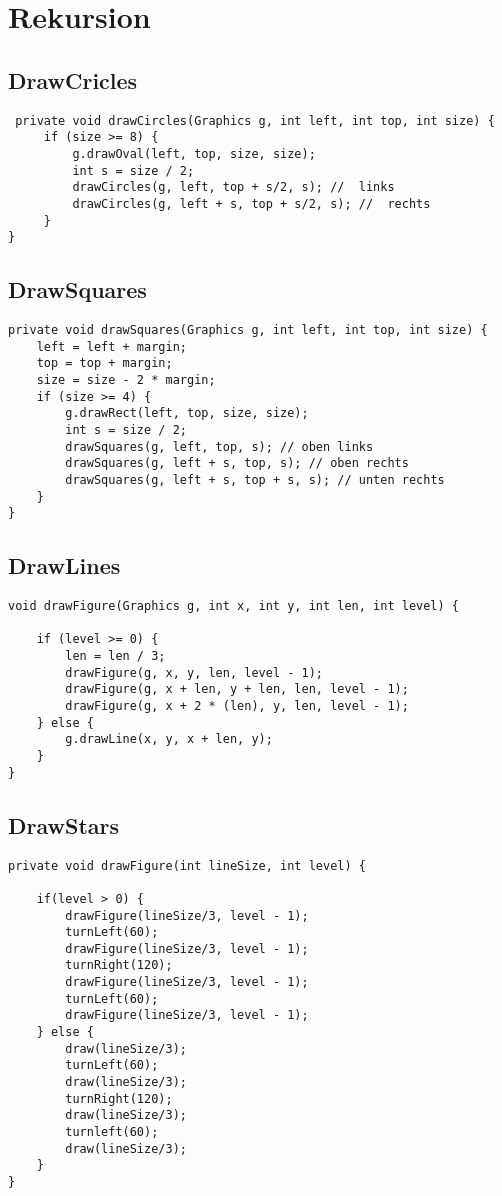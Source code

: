 \section*{Rekursion}
\subsection*{DrawCricles}
\begin{verbatim}
 private void drawCircles(Graphics g, int left, int top, int size) {
     if (size >= 8) {
         g.drawOval(left, top, size, size);
         int s = size / 2;
         drawCircles(g, left, top + s/2, s); //  links
         drawCircles(g, left + s, top + s/2, s); //  rechts
     }
}
\end{verbatim}

\subsection*{DrawSquares}

\begin{verbatim}
private void drawSquares(Graphics g, int left, int top, int size) {
    left = left + margin;
    top = top + margin;
    size = size - 2 * margin;
    if (size >= 4) {
        g.drawRect(left, top, size, size);
        int s = size / 2;
        drawSquares(g, left, top, s); // oben links
        drawSquares(g, left + s, top, s); // oben rechts
        drawSquares(g, left + s, top + s, s); // unten rechts
    }
}
\end{verbatim}

\subsection*{DrawLines}
\begin{verbatim}    
void drawFigure(Graphics g, int x, int y, int len, int level) {

    if (level >= 0) {
        len = len / 3;
        drawFigure(g, x, y, len, level - 1);
        drawFigure(g, x + len, y + len, len, level - 1);
        drawFigure(g, x + 2 * (len), y, len, level - 1);
    } else {
        g.drawLine(x, y, x + len, y);
    }
}
\end{verbatim}

\subsection*{DrawStars}
\begin{verbatim}    
private void drawFigure(int lineSize, int level) {
   
    if(level > 0) {
    	drawFigure(lineSize/3, level - 1);
    	turnLeft(60);
    	drawFigure(lineSize/3, level - 1);
    	turnRight(120);
    	drawFigure(lineSize/3, level - 1);
    	turnLeft(60);
    	drawFigure(lineSize/3, level - 1);
    } else {
    	draw(lineSize/3);
    	turnLeft(60);
   		draw(lineSize/3);
   		turnRight(120);
   		draw(lineSize/3);
   		turnleft(60);
   		draw(lineSize/3);
   	}
}
\end{verbatim}


